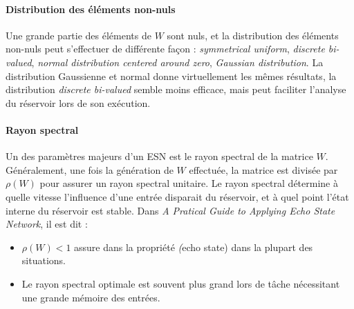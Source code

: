 \documentclass[12pt]{article}
\begin{document}
\paragraph{Distribution des éléments non-nuls}
Une grande partie des éléments de $W$ sont nuls, et la distribution des éléments non-nuls peut s'effectuer de différente façon : \textit{symmetrical uniform}, \textit{discrete bi-valued}, \textit{normal distribution centered around zero}, \textit{Gaussian distribution}.\newline
La distribution Gaussienne et normal donne virtuellement les mêmes résultats, la distribution \textit{discrete bi-valued} semble moins efficace, mais peut faciliter l'analyse du réservoir lors de son exécution.

\paragraph{Rayon spectral}
Un des paramètres majeurs d'un ESN est le rayon spectral de la matrice $W$. Généralement, une fois la génération de $W$ effectuée, la matrice est divisée par $\rho(W)$ pour assurer un rayon spectral unitaire. Le rayon spectral détermine à quelle vitesse l'influence d'une entrée disparait du réservoir, et à quel point l'état interne du réservoir est stable.\newline
Dans \textit{A Pratical Guide to Applying Echo State Network}, il est dit :
\begin{itemize}
\item $\rho(W) < 1$ assure dans la propriété \textit(echo state) dans la plupart des situations.
\item Le rayon spectral optimale est souvent plus grand lors de tâche nécessitant une grande mémoire des entrées.
\end{itemize}
\end{document}
